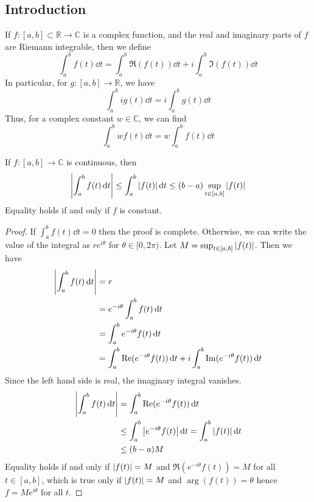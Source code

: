 \subsection{Introduction}
\begin{definition}
	If \( f \colon [a,b] \subset \mathbb R \to \mathbb C \) is a complex function, and the real and imaginary parts of \( f \) are Riemann integrable, then we define
	\[
		\int_a^b f(t) \dd{t} = \int_a^b \Re(f(t)) \dd{t} + i \int_a^b \Im(f(t)) \dd{t}
	\]
	In particular, for \( g \colon [a,b] \to \mathbb R \), we have
	\[
		\int_a^b ig(t) \dd{t} = i\int_a^b g(t) \dd{t}
	\]
	Thus, for a complex constant \( w \in \mathbb C \), we can find
	\[
		\int_a^b wf(t) \dd{t} = w \int_a^b f(t) \dd{t}
	\]
\end{definition}
\begin{proposition}
	If \( f \colon [a,b] \to \mathbb C \) is continuous, then
	\[
		\abs{\int_a^b f(t) \dd{t}} \leq \int_a^b \abs{f(t)} \dd{t} \leq (b-a) \sup_{t \in [a,b]} \abs{f(t)}
	\]
	Equality holds if and only if \( f \) is constant.
\end{proposition}
\begin{proof}
	If \( \int_a^b f(t) \dd{t} = 0 \) then the proof is complete.
	Otherwise, we can write the value of the integral as \( re^{i\theta} \) for \( \theta \in [0, 2\pi) \).
	Let \( M = \sup_{t \in [a,b]} \abs{f(t)} \).
	Then we have
	\begin{align*}
		\abs{\int_a^b f(t) \dd{t}} & = r                                                                                \\
		                           & = e^{-i\theta} \int_a^b f(t) \dd{t}                                                \\
		                           & = \int_a^b e^{-i\theta} f(t) \dd{t}                                                \\
		                           & = \int_a^b \Re(e^{-i\theta} f(t)) \dd{t} + i \int_a^b \Im(e^{-i\theta} f(t)) \dd{t}
	\end{align*}
	Since the left hand side is real, the imaginary integral vanishes.
	\begin{align*}
		\abs{\int_a^b f(t) \dd{t}} & = \int_a^b \Re(e^{-i\theta} f(t)) \dd{t}                                  \\
		                           & \leq \int_a^b \abs{e^{-i\theta} f(t)} \dd{t} = \int_a^b \abs{f(t)} \dd{t} \\
		                           & \leq (b-a)M
	\end{align*}
	Equality holds if and only if \( \abs{f(t)} = M \) and \( \Re(e^{-i\theta} f(t)) = M \) for all \( t \in [a,b] \), which is true only if \( \abs{f(t)} = M \) and \( \arg(f(t)) = \theta \) hence \( f = Me^{i\theta} \) for all \( t \).
\end{proof}

